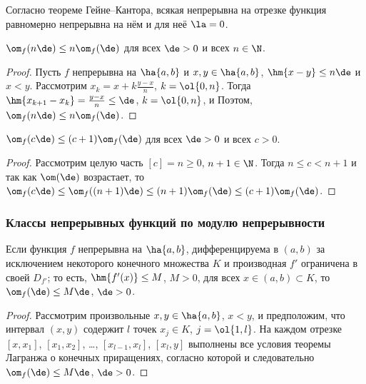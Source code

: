 \documentclass[a4paper]{article}
\newenvironment{imp*}{\par\vskip\theoremskip\textbf{Следствие.}\normalfont \itshape}{\par\vskip\theoremskip}
\begin{document}
Согласно теореме Гейне--Кантора, всякая непрерывна на отрезке
функция равномерно непрерывна на нём и для неё $\la=0$.

\begin{theorem}
$\om_f(n\de) \le n\om_f(\de)$ для всех $\de>0$ и всех $n\in\N$.
\end{theorem}

\begin{proof}
Пусть $f$ непрерывна на $\ha{a,b}$ и $x,y\in\ha{a,b}$, $\hm{x-y} \le
n\de$ и $x<y$. Рассмотрим $x_k = x+k\frac{y-x}n$, $k=\ol{0,n}$.
Тогда $\hm{x_{k+1}-x_k} = \frac{y-x}n\le\de$, $k=\ol{0,n}$, и
 Поэтом,
$\om_f(n\de) \le n\om_f(\de)$.
\end{proof}

\begin{imp*}
$\om_f(c\de) \le (c+1)\om_f(\de)$ для всех $\de>0$ и всех $c>0$.
\end{imp*}

\begin{proof}
Рассмотрим целую часть $[c]=n\ge0$, $n+1\in\N$. Тогда $n\le c < n+1$
и так как $\om(\de)$ возрастает, то $\om_f(c\de) \le \om_f((n+1)\de)
\le (n+1) \om_f(\de) \le (c+1)\om_f(\de)$.
\end{proof}

\subsubsection{Классы непрерывных функций по модулю непрерывности}

\begin{theorem}
Если функция $f$ непрерывна на $\ha{a,b}$, дифференцируема в $(a,b)$
за исключением некоторого конечного множества $K$ и производная $f'$
ограничена в своей $D_{f'}$; то есть, $\hm{f'(x)}\le M$, $M>0$, для
всех $x\in(a,b)\subset K$, то $\om_f(\de) \le M\de$, $\de>0$.
\end{theorem}

\begin{proof}
Рассмотрим произвольные $x,y\in\ha{a,b}$, $x<y$, и предположим, что
интервал $(x,y)$ содержит $l$ точек $x_j\in K$, $j=\ol{1,l}$. На
каждом отрезке $[x,x_1]$, $[x_1,x_2]$, \ldots, $[x_{l-1},x_l]$,
$[x_l,y]$ выполнены все условия теоремы Лагранжа о конечных
приращениях, согласно которой  и следовательно $\om_f(\de) \le M\de$, $\de>0$.
\end{proof}
\end{document}
